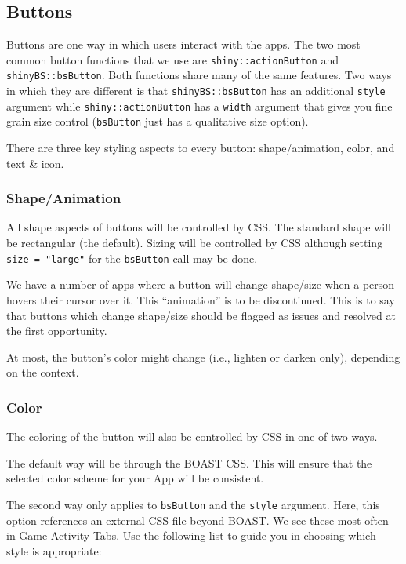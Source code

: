 \documentclass[
]{book}
\begin{document}
\hypertarget{buttonsb}{%
\subsection{Buttons}\label{buttonsb}}

Buttons are one way in which users interact with the apps. The two most common button functions that we use are \texttt{shiny::actionButton} and \texttt{shinyBS::bsButton}. Both functions share many of the same features. Two ways in which they are different is that \texttt{shinyBS::bsButton} has an additional \texttt{style} argument while \texttt{shiny::actionButton} has a \texttt{width} argument that gives you fine grain size control (\texttt{bsButton} just has a qualitative size option).

There are three key styling aspects to every button: shape/animation, color, and text \& icon.

\hypertarget{shapeanimation-1}{%
\subsubsection{Shape/Animation}\label{shapeanimation-1}}

All shape aspects of buttons will be controlled by CSS. The standard shape will be rectangular (the default). Sizing will be controlled by CSS although setting \texttt{size\ =\ "large"} for the \texttt{bsButton} call may be done.

We have a number of apps where a button will change shape/size when a person hovers their cursor over it. This ``animation'' is to be discontinued. This is to say that buttons which change shape/size should be flagged as issues and resolved at the first opportunity.

At most, the button's color might change (i.e., lighten or darken only), depending on the context.

\hypertarget{color-1}{%
\subsubsection{Color}\label{color-1}}

The coloring of the button will also be controlled by CSS in one of two ways.

The default way will be through the BOAST CSS. This will ensure that the selected color scheme for your App will be consistent.

The second way only applies to \texttt{bsButton} and the \texttt{style} argument. Here, this option references an external CSS file beyond BOAST. We see these most often in Game Activity Tabs. Use the following list to guide you in choosing which style is appropriate:
\end{document}
